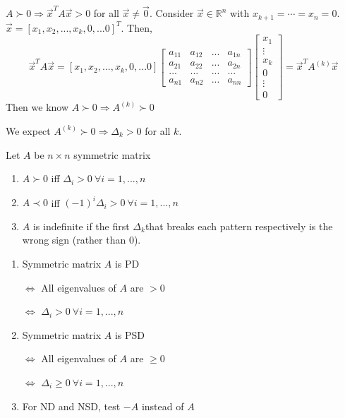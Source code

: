 \documentclass[11pt]{elegantbook}
\begin{document}
$A\succ 0\Rightarrow \vec{x}^TA\vec{x}>0$ for all $\vec{x}\neq \vec{0}$. Consider $\vec{x}\in \mathbb{R}^n$ with $x_{k+1}=\cdots=x_n=0$. $\vec{x}=[x_1,x_2,...,x_k,0,...0]^T$. Then,
$$\vec{x}^TA\vec{x}=[x_1,x_2,...,x_k,0,...0]\begin{bmatrix}
    a_{11}&a_{12}&... &a_{1n}\\a_{21}&a_{22}&...&a_{2n}\\...&...&...&...\\a_{n1}&a_{n2}&...&a_{nn}
\end{bmatrix}\begin{bmatrix}
    x_1\\
    \vdots\\
    x_k\\
    0\\
    \vdots\\
    0
\end{bmatrix}=\vec{x}^TA^{(k)}\vec{x}$$
Then we know $A\succ 0 \Rightarrow A^{(k)}\succ 0$

We expect $A^{(k)}\succ 0\Rightarrow \Delta_k>0$ for all $k$.

\begin{theorem}Let $A$ be $n\times n$ symmetric matrix
    \begin{enumerate}
        \item $A\succ 0$ iff $\Delta_i>0\ \forall i=1,...,n$
        \item $A\prec 0$ iff $(-1)^i\Delta_i>0\ \forall i=1,...,n$
        \item $A$ is indefinite if the first $\Delta_k$that breaks each pattern respectively is the wrong sign (rather than 0).
    \end{enumerate}
\end{theorem}
\begin{proposition}
    \quad

\begin{enumerate}
    \item Symmetric matrix $A$ is PD

    $\Leftrightarrow$ All eigenvalues of $A$ are $>0$
    
    $\Leftrightarrow$ $\Delta_i>0\ \forall i=1,...,n$
    \item Symmetric matrix $A$ is PSD

    $\Leftrightarrow$ All eigenvalues of $A$ are $\geq 0$
    
    $\Leftrightarrow$ $\Delta_i\geq 0\ \forall i=1,...,n$
    \item For ND and NSD, test $-A$ instead of $A$
\end{enumerate}
\end{proposition}
\end{document}
